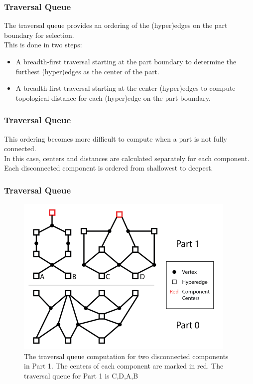 \documentclass{beamer}
\begin{document}
\begin{frame}
  \frametitle{Traversal Queue}
  The traversal queue provides an ordering of the (hyper)edges on the part boundary for selection.\\
  \bigskip
  This is done in two steps:
  \begin{itemize}
  \item A breadth-first traversal starting at the part boundary to determine the furthest (hyper)edges as the center of the part.
  \item A breadth-first traversal starting at the center (hyper)edges to compute topological distance for each (hyper)edge on the part boundary.
  \end{itemize}
\end{frame}

\begin{frame}
  \frametitle{Traversal Queue}
  This ordering becomes more difficult to compute when a part is not fully connected. \\
  
  \bigskip
  In this case, centers and distances are calculated separately for each component. \\
  
  \bigskip
  Each disconnected component is ordered from shallowest to deepest.
\end{frame}

\begin{frame}
  \frametitle{Traversal Queue}
  \begin{figure}
    \centering
    \includegraphics[width=.7\textwidth]{figures/Disconnected.png}
    \caption{The traversal queue computation for two disconnected components in Part 1. The centers of each component are marked in red. The traversal queue for Part 1 is C,D,A,B}
  \end{figure}
\end{frame}
\end{document}
